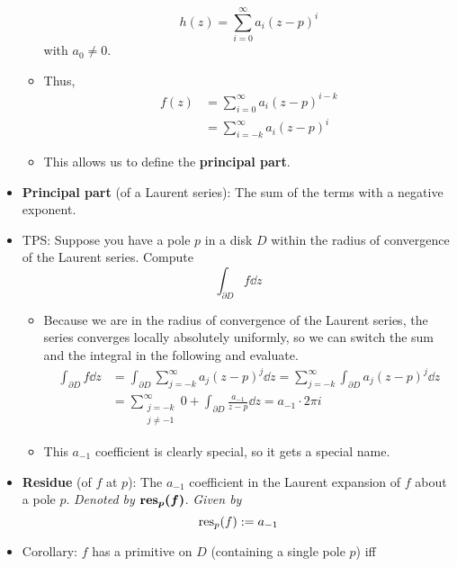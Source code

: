 \documentclass[../notes.tex]{subfiles}
\begin{document}
\begin{itemize}
\begin{itemize}
\begin{equation*}
            h(z) = \sum_{i=0}^\infty a_i(z-p)^i
        \end{equation*}
        with $a_0\neq 0$.
        \item Thus,
        \begin{align*}
            f(z) &= \sum_{i=0}^\infty a_i(z-p)^{i-k}\\
            &= \sum_{i=-k}^\infty a_i(z-p)^i
        \end{align*}
        \item This allows us to define the \textbf{principal part}.
    \end{itemize}
    \item \textbf{Principal part} (of a Laurent series): The sum of the terms with a negative exponent.
    \item TPS: Suppose you have a pole $p$ in a disk $D$ within the radius of convergence of the Laurent series. Compute
    \begin{equation*}
        \int_{\partial D}f\dd{z}
    \end{equation*}
    \begin{itemize}
        \item Because we are in the radius of convergence of the Laurent series, the series converges locally absolutely uniformly, so we can switch the sum and the integral in the following and evaluate.
        \begin{align*}
            \int_{\partial D}f\dd{z} &= \int_{\partial D}\sum_{j=-k}^\infty a_j(z-p)^j\dd{z}
                = \sum_{j=-k}^\infty\int_{\partial D}a_j(z-p)^j\dd{z}\\
            &= \sum_{\substack{j=-k\\j\neq -1}}^\infty 0+\int_{\partial D}\frac{a_{-1}}{z-p}\dd{z}
                = a_{-1}\cdot 2\pi i
        \end{align*}
        \item This $a_{-1}$ coefficient is clearly special, so it gets a special name.
    \end{itemize}
    \item \textbf{Residue} (of $f$ at $p$): The $a_{-1}$ coefficient in the Laurent expansion of $f$ about a pole $p$. \emph{Denoted by} $\bm{\res_p(f)}$. \emph{Given by}
    \begin{equation*}
        \operatorname{res}_p(f) := a_{-1}
    \end{equation*}
    \item Corollary: $f$ has a primitive on $D$ (containing a single pole $p$) iff
    \begin{equation*}

\end{equation*}
\end{itemize}
\end{document}
